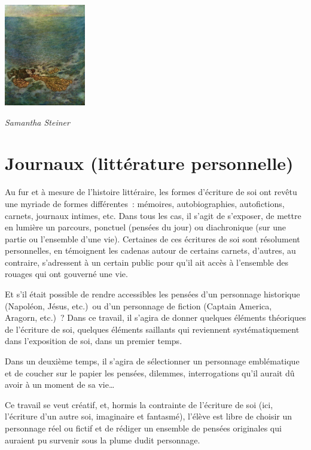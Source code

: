 \documentclass[
  10pt,
  french,
  a5paper,
  openany]{book}
\newenvironment{signature}{\begin{flushright}}{\end{flushright}}
\begin{document}
\begin{center}
\includegraphics[width=\textwidth,height=12em]{images/un-conte-et-des-conteurs.jpg}

\end{center}

\begin{signature}
\emph{Samantha Steiner}

\end{signature}

\hypertarget{journaux-littuxe9rature-personnelle}{%
\chapter{Journaux (littérature personnelle)}\label{journaux-littuxe9rature-personnelle}}

Au fur et à mesure de l'histoire littéraire, les formes d'écriture de soi ont revêtu une myriade de formes différentes~: mémoires, autobiographies, autofictions, carnets, journaux intimes, etc. Dans tous les cas, il s'agit de s'exposer, de mettre en lumière un parcours, ponctuel (pensées du jour) ou diachronique (sur une partie ou l'ensemble d'une vie). Certaines de ces écritures de soi sont résolument personnelles, en témoignent les cadenas autour de certains carnets, d'autres, au contraire, s'adressent à un certain public pour qu'il ait accès à l'ensemble des rouages qui ont gouverné une vie.

Et s'il était possible de rendre accessibles les pensées d'un personnage historique (Napoléon, Jésus, etc.)~ou d'un personnage de fiction (Captain America, Aragorn, etc.)~? Dans ce travail, il s'agira de donner quelques éléments théoriques de l'écriture de soi, quelques éléments saillants qui reviennent systématiquement dans l'exposition de soi, dans un premier temps.

Dans un deuxième temps, il s'agira de sélectionner un personnage emblématique et de coucher sur le papier les pensées, dilemmes, interrogations qu'il aurait dû avoir à un moment de sa vie\ldots{}

Ce travail se veut créatif, et, hormis la contrainte de l'écriture de soi (ici, l'écriture d'un autre soi, imaginaire et fantasmé), l'élève est libre de choisir un personnage réel ou fictif et de rédiger un ensemble de pensées originales qui auraient pu survenir sous la plume dudit personnage.
\end{document}

